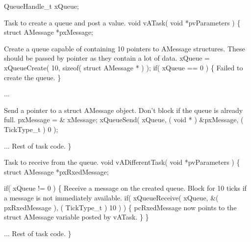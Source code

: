 \begin{DoxyPre} QueueHandle\_t xQueue;\end{DoxyPre}



\begin{DoxyPre}Task to create a queue and post a value.
 void vATask( void *pvParameters )
 \{
 struct AMessage *pxMessage;\end{DoxyPre}



\begin{DoxyPre}Create a queue capable of containing 10 pointers to AMessage structures.
These should be passed by pointer as they contain a lot of data.
    xQueue = xQueueCreate( 10, sizeof( struct AMessage * ) );
    if( xQueue == 0 )
    \{
Failed to create the queue.
    \}\end{DoxyPre}



\begin{DoxyPre}...\end{DoxyPre}



\begin{DoxyPre}Send a pointer to a struct AMessage object.  Don't block if the
queue is already full.
    pxMessage = \& xMessage;
    xQueueSend( xQueue, ( void * ) \&pxMessage, ( TickType\_t ) 0 );\end{DoxyPre}



\begin{DoxyPre}... Rest of task code.
 \}\end{DoxyPre}



\begin{DoxyPre}Task to receive from the queue.
 void vADifferentTask( void *pvParameters )
 \{
 struct AMessage *pxRxedMessage;\end{DoxyPre}



\begin{DoxyPre}    if( xQueue != 0 )
    \{
Receive a message on the created queue.  Block for 10 ticks if a
message is not immediately available.
        if( xQueueReceive( xQueue, \&( pxRxedMessage ), ( TickType\_t ) 10 ) )
        \{
pcRxedMessage now points to the struct AMessage variable posted
by vATask.
        \}
    \}\end{DoxyPre}



\begin{DoxyPre}... Rest of task code.
 \}
 \end{DoxyPre}


